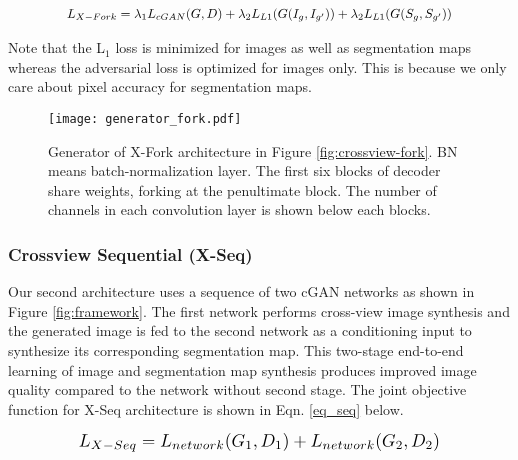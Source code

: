\documentclass[times,twocolumn,final,authoryear]{elsarticle_modified}
\begin{document}
\vspace{-15pt}

\begin{equation}\label{eq_fork}
\begin{split}
\resizebox{0.8\hsize}{!}{$L_{X-Fork} = \lambda_1 L_{cGAN}(G, D) + \lambda_2 L_{L1}(G(I_g,I_{g'}))+ \lambda_2 L_{L1}(G(S_g,S_{g'}))
$}\end{split}
\end{equation}

Note that the L$_1$ loss is minimized for images as well as segmentation maps whereas the adversarial loss is optimized for images only. This is because we only care about pixel accuracy for segmentation maps. 


\begin{figure}
\centering
\texttt{[image: generator\_fork.pdf]}
\caption{\small \label{fig:crossview-fork-gen}Generator of X-Fork architecture in Figure \ref{fig:crossview-fork}. BN means batch-normalization layer.
The first six blocks of decoder share weights, forking at the penultimate block. 
The number of channels in each convolution layer is shown below each blocks. }
\vspace{-15pt}
\end{figure}

\vspace{-5pt}

\subsubsection{\label{seq} Crossview Sequential (X-Seq)}
Our second architecture uses a sequence of two cGAN networks as shown in Figure \ref{fig:framework}. The first network performs cross-view image synthesis and the generated image is fed to the second network as a conditioning input to synthesize its corresponding segmentation map. This two-stage end-to-end learning of image and segmentation map synthesis produces improved image quality compared to the network without second stage. The joint objective function for X-Seq architecture is shown in Eqn. \ref{eq_seq} below.
\vspace{-15pt}

\begin{equation}\label{eq_seq}
\begin{split}
\resizebox{0.75\hsize}{!}{$L_{X-Seq} = L_{network}(G_1, D_1) + L_{network}(G_2, D_2)
$}\end{split}
\end{equation}
\end{document}
